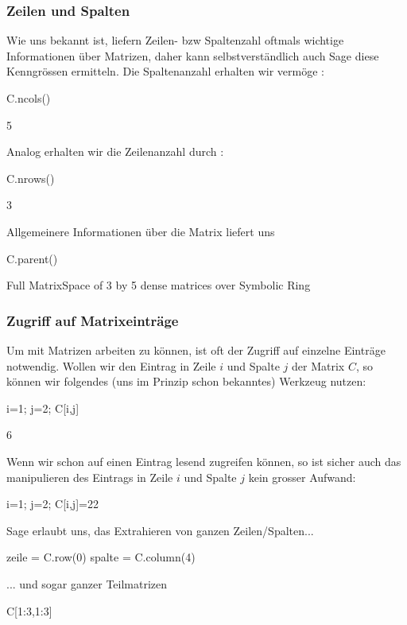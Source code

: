 \documentclass[fontsize=12pt,paper=a4,twoside,bibtotoc,idxtotoc,
liststotoc,pagesize,BCOR1.2cm,DIV15,chapterprefix,pagesize=pdftex]{scrbook}
\theoremstyle{plain}
\theoremstyle{definition}
\theoremstyle{remark}
\begin{document}
\subsubsection{Zeilen und Spalten}
Wie uns bekannt ist, liefern Zeilen- bzw Spaltenzahl oftmals wichtige Informationen über Matrizen, daher kann selbstverständlich auch Sage diese Kenngrössen ermitteln. 
Die Spaltenanzahl erhalten wir vermöge :
\begin{sagein}
C.ncols()
\end{sagein}
\begin{sage}
  5
\end{sage}
Analog erhalten wir die Zeilenanzahl durch :
\begin{sagein}
C.nrows()
\end{sagein}
\begin{sage}
  3
\end{sage}
Allgemeinere Informationen über die Matrix liefert uns 
\begin{sagein}
C.parent()
\end{sagein}
\begin{sage}
Full MatrixSpace of 3 by 5 dense matrices over Symbolic Ring
\end{sage}
\subsubsection{Zugriff auf Matrixeinträge}
Um mit Matrizen arbeiten zu können, ist oft der Zugriff auf einzelne Einträge notwendig. Wollen wir den Eintrag in Zeile $i$ und Spalte $j$ der Matrix $C$, so können wir folgendes 
(uns im Prinzip schon bekanntes) Werkzeug nutzen:
\begin{sagein}
i=1; j=2; C[i,j]
\end{sagein}
\begin{sage}
  6
\end{sage}
Wenn wir schon auf einen Eintrag lesend zugreifen können, so ist sicher auch das manipulieren des Eintrags in Zeile $i$ und Spalte $j$ kein grosser Aufwand:
\begin{sagein}
i=1; j=2; C[i,j]=22
\end{sagein}
Sage erlaubt uns, das Extrahieren von ganzen Zeilen/Spalten...
\begin{sagein}
zeile = C.row(0)
spalte = C.column(4)
\end{sagein}
... und sogar ganzer Teilmatrizen
\begin{sagein}
C[1:3,1:3]
\end{sagein}
\end{document}
